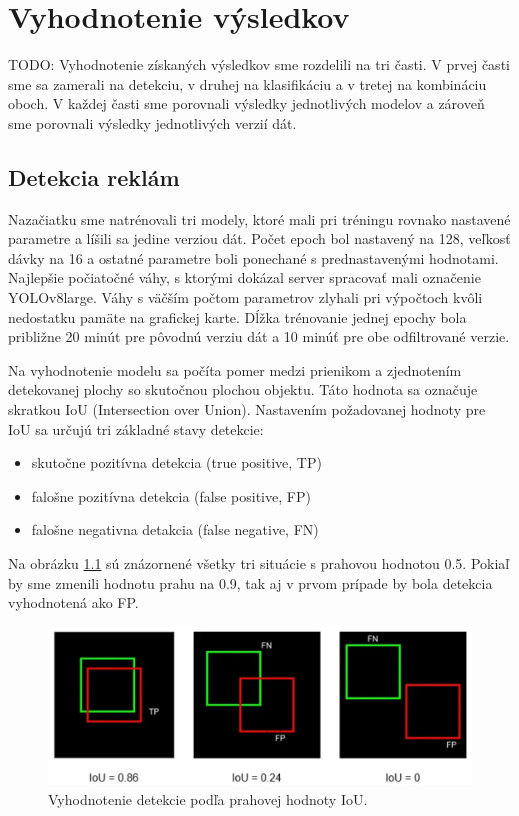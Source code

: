 \chapter{Vyhodnotenie výsledkov}\label{chap:results}

TODO: Vyhodnotenie získaných výsledkov sme rozdelili na tri časti. V prvej časti sme sa zamerali na detekciu, v druhej na klasifikáciu a v tretej na kombináciu oboch. V každej časti sme porovnali výsledky jednotlivých modelov a zároveň sme porovnali výsledky jednotlivých verzií dát.

\section{Detekcia reklám}

Nazačiatku sme natrénovali tri modely, ktoré mali pri tréningu rovnako nastavené parametre a líšili sa jedine verziou dát. Počet epoch bol nastavený na 128, veľkosť dávky na 16 a ostatné parametre boli ponechané s prednastavenými hodnotami. Najlepšie počiatočné váhy, s ktorými dokázal server spracovať mali označenie YOLOv8large. Váhy s väčším počtom parametrov zlyhali pri výpočtoch kvôli nedostatku pamäte na grafickej karte. Dĺžka trénovanie jednej epochy bola približne 20 minút pre pôvodnú verziu dát a 10 minúť pre obe odfiltrované verzie.

Na vyhodnotenie modelu sa počíta pomer medzi prienikom a zjednotením detekovanej plochy so skutočnou plochou objektu. Táto hodnota sa označuje skratkou IoU (Intersection over Union). Nastavením požadovanej hodnoty pre IoU sa určujú tri základné stavy detekcie:

\begin{itemize}
  \item skutočne pozitívna detekcia (true positive, TP)
  \item falošne pozitívna detekcia (false positive, FP)
  \item falošne negativna detakcia (false negative, FN)
\end{itemize}

Na obrázku \ref{img:ious} sú znázornené všetky tri situácie s prahovou hodnotou 0.5. Pokiaľ by sme zmenili hodnotu prahu na 0.9, tak aj v prvom prípade by bola detekcia vyhodnotená ako FP.

\begin{figure}[ht]
    \centering
    \includegraphics[width=1\textwidth]{images/05/ious.png}
    \caption{Vyhodnotenie detekcie podľa prahovej hodnoty IoU.}
    \label{img:ious}
\end{figure}

